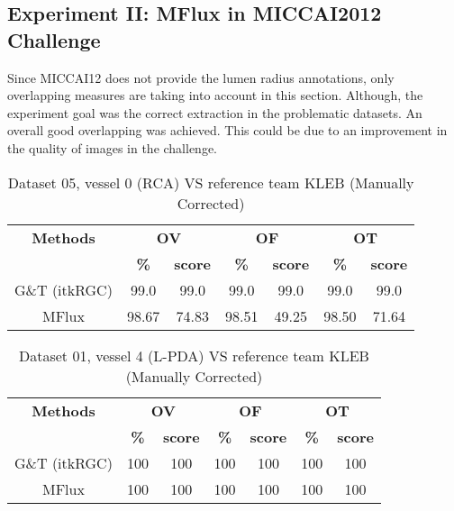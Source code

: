 \subsection{Experiment II: MFlux in MICCAI2012 Challenge}

Since MICCAI12 does not provide the lumen radius annotations, only overlapping measures are taking into account in this section. Although, the experiment goal was the correct extraction in the problematic datasets. An overall good overlapping was achieved. This could be due to an improvement in the quality of images in the challenge.

\begin{table*}[h]
\scriptsize
\caption{Dataset 05, vessel 0 (RCA) VS reference team KLEB (Manually Corrected)}
\centering
\begin{tabular}{|c|cc|cc|cc|}
\hline
\multicolumn{1}{|c|}{\textbf{Methods}} &\multicolumn{2}{c|}{\textbf{OV}} &\multicolumn{2}{c|}{\textbf{OF}} &\multicolumn{2}{c|}{\textbf{OT}}\\
\multicolumn{1}{|c|}{\textbf{}} &\multicolumn{1}{c|}{\textbf{\%}} &\multicolumn{1}{c|}{\textbf{score}} &\multicolumn{1}{c|}{\textbf{\%}} &\multicolumn{1}{c|}{\textbf{score}} &\multicolumn{1}{c|}{\textbf{\%}} &\multicolumn{1}{c|}{\textbf{score}}\\
\hline
G\&T (itkRGC)&99.0 &99.0 &99.0 &99.0&99.0&99.0\\
MFlux&98.67&74.83& 98.51&49.25& 98.50&71.64\\
\hline
\end{tabular}
\vspace{-0.3cm}
\label{tb:tb_4_7}
\normalsize
\end{table*}

\begin{table*}[h]
\scriptsize
\caption{Dataset 01, vessel 4 (L-PDA) VS reference team KLEB (Manually Corrected)}
\centering
\begin{tabular}{|c|cc|cc|cc|}
\hline
\multicolumn{1}{|c|}{\textbf{Methods}} &\multicolumn{2}{c|}{\textbf{OV}} &\multicolumn{2}{c|}{\textbf{OF}} &\multicolumn{2}{c|}{\textbf{OT}}\\
\multicolumn{1}{|c|}{\textbf{}} &\multicolumn{1}{c|}{\textbf{\%}} &\multicolumn{1}{c|}{\textbf{score}} &\multicolumn{1}{c|}{\textbf{\%}} &\multicolumn{1}{c|}{\textbf{score}} &\multicolumn{1}{c|}{\textbf{\%}} &\multicolumn{1}{c|}{\textbf{score}}\\
\hline
G\&T (itkRGC)&100 &100&100 &100&100&100\\
MFlux&100&100& 100&100&100&100\\
\hline
\end{tabular}
\vspace{-0.3cm}
\label{tb:tb_4_7}
\normalsize
\end{table*}
	

